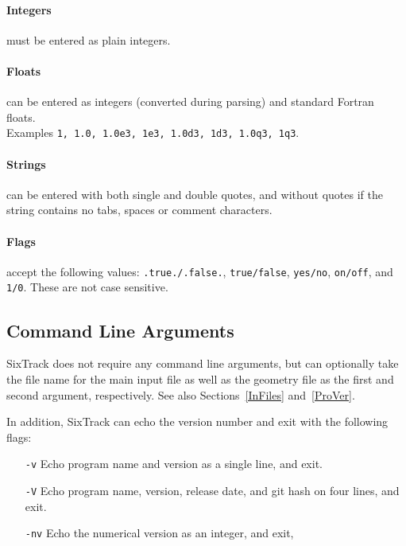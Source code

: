 \paragraph{Integers} must be entered as plain integers.
\paragraph{Floats} can be entered as integers (converted during parsing) and standard Fortran floats.\\
Examples \texttt{1, 1.0, 1.0e3, 1e3, 1.0d3, 1d3, 1.0q3, 1q3}.
\paragraph{Strings} can be entered with both single and double quotes, and without quotes if the string contains no tabs, spaces or comment characters.
\paragraph{Flags} accept the following values: \texttt{.true./.false.}, \texttt{true/false}, \texttt{yes/no}, \texttt{on/off}, and \texttt{1/0}. These are not case sensitive.

\subsection{Command Line Arguments} \label{sec:cmdarg}

SixTrack does not require any command line arguments, but can optionally take the file name for the main input file as well as the geometry file as the first and second argument, respectively.
See also Sections~\ref{InFiles} and~\ref{ProVer}.

\bigskip
\noindent In addition, SixTrack can echo the version number and exit with the following flags:
\begin{itemize}
    \item[\texttt{-v}] Echo program name and version as a single line, and exit.
    \item[\texttt{-V}] Echo program name, version, release date, and git hash on four lines, and exit.
    \item[\texttt{-nv}] Echo the numerical version as an integer, and exit,
\end{itemize}
